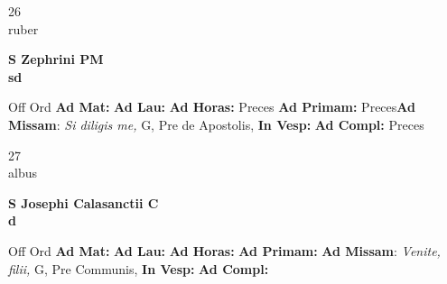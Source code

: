 \documentclass[10pt, openany]{book}
\begin{document}
    \begin{center}
        \begin{minipage}{3.5in}
            \vspace{2em}
            \begin{minipage}{0.5in}
                {\Huge 26} \\
                {\normalsize ruber}
            \end{minipage}
            \begin{minipage}{3.0in}
                \textbf{ \large S Zephrini PM \\
                \textnormal{\normalsize sd}}

            \end{minipage}
            \begin{justify}Off Ord
                \textbf{Ad Mat: }
                \textbf{Ad Lau: }
                \textbf{Ad Horas: }Preces
                \textbf{Ad Primam: }Preces\textbf{Ad Missam}: \textit{Si diligis me,} G, Pre de Apostolis, 
                \textbf{In Vesp: }
                \textbf{Ad Compl: }Preces
            \end{justify}
        \end{minipage}
    \end{center}

    \begin{center}
        \begin{minipage}{3.5in}
            \vspace{2em}
            \begin{minipage}{0.5in}
                {\Huge 27} \\
                {\normalsize albus}
            \end{minipage}
            \begin{minipage}{3.0in}
                \textbf{ \large S Josephi Calasanctii C \\
                \textnormal{\normalsize d}}

            \end{minipage}
            \begin{justify}Off Ord
                \textbf{Ad Mat: }
                \textbf{Ad Lau: }
                \textbf{Ad Horas: }
                \textbf{Ad Primam: }\textbf{Ad Missam}: \textit{Venite, filii,} G, Pre Communis, 
                \textbf{In Vesp: }
                \textbf{Ad Compl: }
            \end{justify}
        \end{minipage}
    \end{center}
\end{document}
